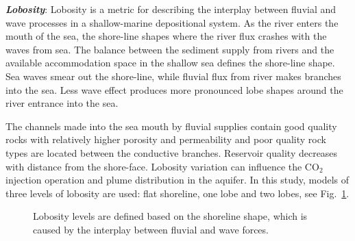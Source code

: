 \textbf{\textit{Lobosity}}: Lobosity is a metric for describing the interplay
between fluvial and wave processes in a shallow-marine depositional system. As
the river enters the mouth of the sea, the shore-line shapes where the river
flux crashes with the waves from sea. The balance between the sediment supply from
rivers and the available accommodation space in the shallow sea defines the
shore-line shape. Sea waves smear out the shore-line, while fluvial flux from
river makes branches into the sea. Less wave effect produces more pronounced
lobe shapes around the river entrance into the sea. 

The channels made into the sea mouth by fluvial supplies contain good quality
rocks with relatively higher porosity and permeability and poor quality rock
types are located between the conductive branches. Reservoir quality decreases
with distance from the shore-face. Lobosity variation can influence the CO$_2$
injection operation and plume distribution in the aquifer. In this study, models
of three levels of lobosity are used: flat shoreline, one lobe and two lobes,
see Fig.~\ref{fig:lobCauses}.

 
\begin{figure}[tbp]%
  
   \hspace{0.5cm}
  \hspace{0.5cm}

  \caption{Lobosity levels are defined based on the shoreline shape, which is
caused by the interplay between fluvial and wave forces.}
 \label{fig:lobCauses}
\end{figure}

